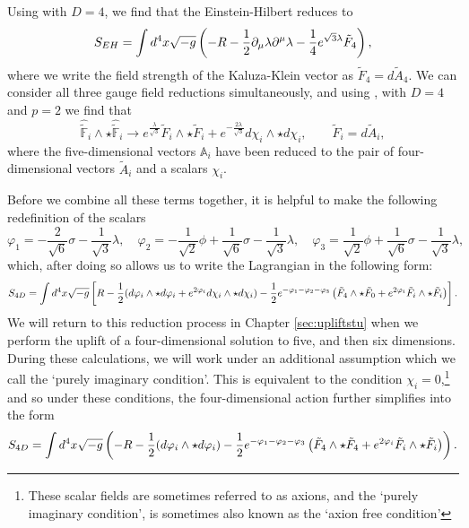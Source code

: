 Using  with $D = 4$, we find that the Einstein-Hilbert reduces to
\begin{equation*}
	S_{EH} = 
	\int d^4x \sqrt{-g} \left(-R - \frac{1}{2} \partial_\mu \lambda \partial^\mu \lambda - \frac{1}{4} e^{\sqrt{3} \lambda} \tilde{F}_4 \right),
\end{equation*}
where we write the field strength of the Kaluza-Klein vector as $\tilde{F}_4 = d\tilde{A}_4$. We can consider all three gauge field reductions simultaneously, and using , with $D = 4$ and $p = 2$ we find that
\begin{equation*}
	\hat{\tilde{\mathbb{F}}}_i \wedge \star \hat{\tilde{\mathbb{F}}}_i \rightarrow e^{\frac{\lambda}{\sqrt{3}}}  \tilde{F}_i \wedge \star \tilde{F}_i + e^{-\frac{2\lambda}{\sqrt{3}}}  d \chi_i \wedge \star d \chi_i, \qquad \tilde{F}_i = d\tilde{A}_i,
\end{equation*}
where the five-dimensional vectors $\mathbb{A}_i$ have been reduced to the pair of four-dimensional vectors $\tilde{A}_i$ and a scalars $\chi_i$. 

Before we combine all these terms together, it is helpful to make the following redefinition of the scalars
\begin{equation*}
	 \varphi_1 = -\frac{2}{\sqrt{6}} \sigma - \frac{1}{\sqrt{3}} \lambda , \quad \varphi_2 = -\frac{1}{\sqrt{2}} \phi + \frac{1}{\sqrt{6}} \sigma - \frac{1}{\sqrt{3}} \lambda , \quad \varphi_3 = \frac{1}{\sqrt{2}} \phi + \frac{1}{\sqrt{6}} \sigma - \frac{1}{\sqrt{3}} \lambda ,
\end{equation*}
which, after doing so allows us to write the Lagrangian in the following form:
\begin{equation*}
	S_{4D} = \int d^4x \sqrt{-g} \left[ R - \frac{1}{2} (d \varphi_i \wedge \star d\varphi_i + e^{2\varphi_i} d\chi_i \wedge \star d\chi_i) - \frac{1}{2} e^{-\varphi_1 - \varphi_2 - \varphi_3} \left(\tilde{F}_4 \wedge \star \tilde{F}_0 + e^{2\varphi_i} \tilde{F}_i \wedge \star \tilde{F}_i\right) \right].
\end{equation*}
We will return to this reduction process in Chapter \ref{sec:upliftstu} when we perform the uplift of a four-dimensional solution to five, and then six dimensions. During these calculations, we will work under an additional assumption which we call the `purely imaginary condition'. This is equivalent to the condition $\chi_i = 0$,\footnote{These scalar fields are sometimes referred to as axions, and the `purely imaginary condition', is sometimes also known as the `axion free condition'} and so under these conditions, the four-dimensional action further simplifies into the form
\begin{equation}
	S_{4D} = \int d^4x \sqrt{-g} \left( -R - \frac{1}{2} (d \varphi_i \wedge \star d\varphi_i) - \frac{1}{2} e^{-\varphi_1 - \varphi_2 - \varphi_3} \left(\tilde{F}_4 \wedge \star \tilde{F}_4 + e^{2\varphi_i} \tilde{F}_i \wedge \star \tilde{F}_i\right) \right).
\end{equation}

